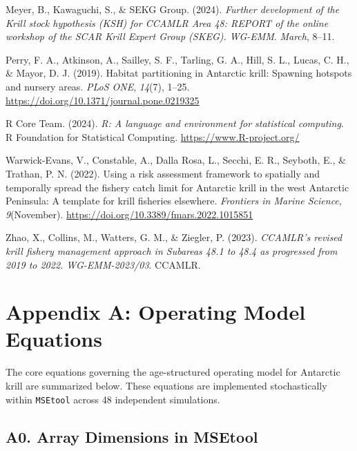 \documentclass[
]{article}
\newlength{\cslhangindent}
\newlength{\cslentryspacingunit} %
\newenvironment{CSLReferences}[2] %
 {%
  \setlength{\parindent}{0pt}
  \ifodd #1
  \let\oldpar\par
  \def\par{\hangindent=\cslhangindent\oldpar}
  \fi
  \setlength{\parskip}{#2\cslentryspacingunit}
 }%
 {}
\begin{document}
\begin{CSLReferences}{1}{0}
\leavevmode{}%
Meyer, B., Kawaguchi, S., \& SEKG Group. (2024). \emph{{Further development of the Krill stock hypothesis (KSH) for CCAMLR Area 48: REPORT of the online workshop of the SCAR Krill Expert Group (SKEG). WG-EMM}}. \emph{March}, 8--11.

\leavevmode{}%
Perry, F. A., Atkinson, A., Sailley, S. F., Tarling, G. A., Hill, S. L., Lucas, C. H., \& Mayor, D. J. (2019). {Habitat partitioning in Antarctic krill: Spawning hotspots and nursery areas}. \emph{PLoS ONE}, \emph{14}(7), 1--25. \url{https://doi.org/10.1371/journal.pone.0219325}

\leavevmode{}%
R Core Team. (2024). \emph{R: A language and environment for statistical computing}. R Foundation for Statistical Computing. \url{https://www.R-project.org/}

\leavevmode{}%
Warwick-Evans, V., Constable, A., Dalla Rosa, L., Secchi, E. R., Seyboth, E., \& Trathan, P. N. (2022). {Using a risk assessment framework to spatially and temporally spread the fishery catch limit for Antarctic krill in the west Antarctic Peninsula: A template for krill fisheries elsewhere}. \emph{Frontiers in Marine Science}, \emph{9}(November). \url{https://doi.org/10.3389/fmars.2022.1015851}

\leavevmode{}%
Zhao, X., Collins, M., Watters, G. M., \& Ziegler, P. (2023). \emph{{CCAMLR's revised krill fishery management approach in Subareas 48.1 to 48.4 as progressed from 2019 to 2022. WG-EMM-2023/03}}. CCAMLR.

\end{CSLReferences}

\pagebreak

\hypertarget{appendix-a-operating-model-equations}{%
\section{Appendix A: Operating Model Equations}\label{appendix-a-operating-model-equations}}

The core equations governing the age-structured operating model for Antarctic krill are summarized below. These equations are implemented stochastically within \texttt{MSEtool} across 48 independent simulations.

\hypertarget{a0.-array-dimensions-in-msetool}{%
\subsection{A0. Array Dimensions in MSEtool}\label{a0.-array-dimensions-in-msetool}}
\end{document}
